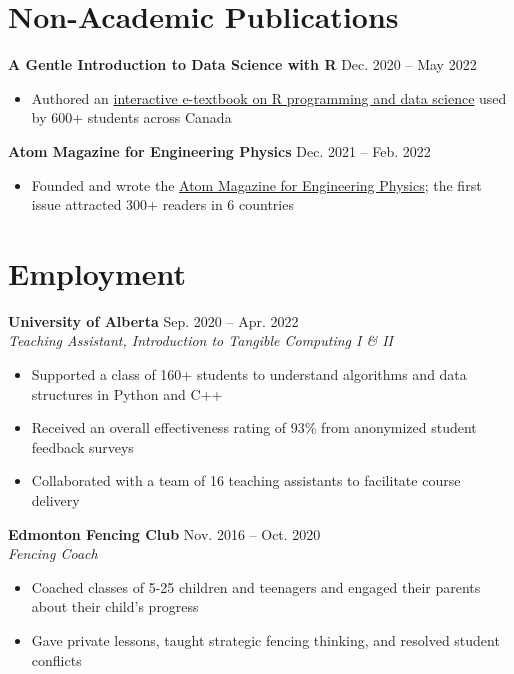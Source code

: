 \documentclass{article}
\begin{document}
\section*{\textcolor{my_colour}{Non-Academic Publications}}
\vspace{-.25em} \hrulefill \vspace{.25em}

\textbf{A Gentle Introduction to Data Science with R} \hfill Dec. 2020 -- May 2022
\begin{itemize}
    \item Authored an \href{https://youreka-textbook.netlify.app/}{interactive e-textbook on R programming and data science} used by 600+ students across Canada
\end{itemize} \vspace{1em}

\textbf{Atom Magazine for Engineering Physics} \hfill Dec. 2021 -- Feb. 2022
\begin{itemize}
    \item Founded and wrote the \href{https://atom-winter-2022.netlify.app/}{Atom Magazine for Engineering Physics}; the first issue attracted 300+ readers in 6 countries
\end{itemize}


\section*{\textcolor{my_colour}{Employment}}
\vspace{-.25em} \hrulefill \vspace{.25em}

\textbf{University of Alberta} \hfill Sep. 2020 -- Apr. 2022 \\
\textit{Teaching Assistant, Introduction to Tangible Computing I \& II}
\begin{itemize}
    \item Supported a class of 160+ students to understand algorithms and data structures in Python and C++
    \item Received an overall effectiveness rating of 93\% from anonymized student feedback surveys
    \item Collaborated with a team of 16 teaching assistants to facilitate course delivery
\end{itemize} \vspace{1em}

\textbf{Edmonton Fencing Club} \hfill Nov. 2016 -- Oct. 2020 \\
\textit{Fencing Coach}
\begin{itemize}
    \item Coached classes of 5-25 children and teenagers and engaged their parents about their child's progress
    \item Gave private lessons, taught strategic fencing thinking, and resolved student conflicts
\end{itemize}
\end{document}
